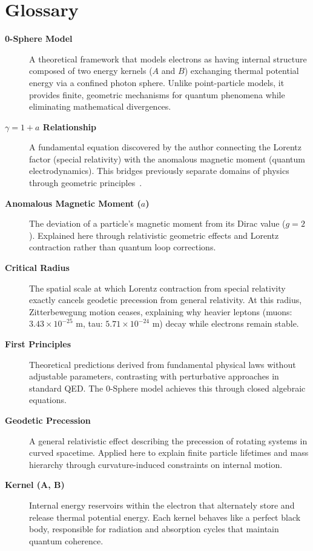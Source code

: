 \documentclass[%
 reprint,
 amsmath,amssymb,
 aps,
]{revtex4-1}
\numberwithin{equation}{section}%
\begin{document}
\section{Glossary}
\begin{description}
  
  \item[\textbf{0-Sphere Model}] A theoretical framework that models electrons as having internal structure composed of two energy kernels ($A$ and $B$) exchanging thermal potential energy via a confined photon sphere. Unlike point-particle models, it provides finite, geometric mechanisms for quantum phenomena while eliminating mathematical divergences.
    
  \item[\textbf{$\gamma = 1 + a$ Relationship}] A fundamental equation discovered by the author connecting the Lorentz factor (special relativity) with the anomalous magnetic moment (quantum electrodynamics). This bridges previously separate domains of physics through geometric principles~\cite{hanamura2504.0115}.

  \item[\textbf{Anomalous Magnetic Moment ($a$)}] The deviation of a particle's magnetic moment from its Dirac value ($g=2$). Explained here through relativistic geometric effects and Lorentz contraction rather than quantum loop corrections.
  
  \item[\textbf{Critical Radius}] The spatial scale at which Lorentz contraction from special relativity exactly cancels geodetic precession from general relativity. At this radius, Zitterbewegung motion ceases, explaining why heavier leptons (muons: $3.43 \times 10^{-25}$ m, tau: $5.71 \times 10^{-24}$ m) decay while electrons remain stable.
  
  \item[\textbf{First Principles}] Theoretical predictions derived from fundamental physical laws without adjustable parameters, contrasting with perturbative approaches in standard QED. The 0-Sphere model achieves this through closed algebraic equations.
  
  \item[\textbf{Geodetic Precession}] A general relativistic effect describing the precession of rotating systems in curved spacetime. Applied here to explain finite particle lifetimes and mass hierarchy through curvature-induced constraints on internal motion.
  
  \item[\textbf{Kernel (A, B)}] Internal energy reservoirs within the electron that alternately store and release thermal potential energy. Each kernel behaves like a perfect black body, responsible for radiation and absorption cycles that maintain quantum coherence.
  

\end{description}
\end{document}
